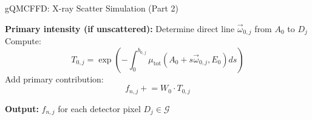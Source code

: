 \begin{algorithm}
\caption{gQMCFFD: X-ray Scatter Simulation (Part 2)}
\begin{algorithmic}[1]

\vspace{.25cm}
\State \textbf{Primary intensity (if unscattered):}
    \State Determine direct line $\vec{\omega}_{0,j}$ from $A_0$ to $D_j$
    \State Compute:
    \[
    T_{0,j} = \exp\left(-\int_0^{b_{0,j}} \mu_{\text{tot}}(A_0 + s\vec{\omega}_{0,j}, E_0) ds\right)
    \]
    \State Add primary contribution:
    \[
    f_{n,j} \mathrel{+}= W_0 \cdot T_{0,j}
    \]
\EndFor

\State \textbf{Output:} $f_{n,j}$ for each detector pixel $D_j \in \mathcal{G}$

\end{algorithmic}
\end{algorithm}